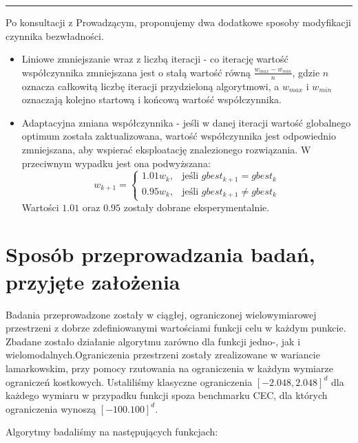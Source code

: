 \documentclass[12pt]{article}
\begin{document}
\begin{center}
	\rule{0.8\linewidth}{0.4pt}
\end{center}

Po konsultacji z Prowadzącym, proponujemy dwa dodatkowe sposoby modyfikacji czynnika bezwładności.
\begin{itemize}
	\item Liniowe zmniejszanie wraz z liczbą iteracji - co iterację wartość współczynnika zmniejszana
	      jest o stałą wartość równą $\frac{w_{max} - w_{min}}{n}$, gdzie $n$ oznacza całkowitą liczbę iteracji
	      przydzieloną algorytmowi, a $w_{max}$ i $w_{min}$ oznaczają kolejno startową i końcową wartość współczynnika.
	\item Adaptacyjna zmiana współczynnika - jeśli w danej iteracji wartość globalnego optimum została zaktualizowana, wartość współczynnika
	      jest odpowiednio zmniejszana, aby wspierać eksploatację znalezionego rozwiązania. W przeciwnym wypadku jest ona podwyższana:
	      \[
		      w_{k+1} =
		      \begin{cases}
			      1.01w_{k}, & \text{jeśli } gbest_{k+1} = gbest_{k}    \\
			      0.95w_{k}, & \text{jeśli } gbest_{k+1} \neq gbest_{k}
		      \end{cases}
	      \]
	      Wartości $1.01$ oraz $0.95$ zostały dobrane eksperymentalnie.
\end{itemize}

\section{Sposób przeprowadzania badań, przyjęte założenia}

Badania przeprowadzone zostały w ciągłej, ograniczonej wielowymiarowej przestrzeni z dobrze zdefiniowanymi wartościami funkcji celu w każdym punkcie.
Zbadane zostało działanie algorytmu zarówno dla funkcji jedno-, jak i wielomodalnych.Ograniczenia przestrzeni zostały zrealizowane w wariancie lamarkowskim,
przy pomocy rzutowania na ograniczenia w każdym wymiarze ograniczeń kostkowych. Ustaliliśmy klasyczne ograniczenia $[-2.048, 2.048]^d$ dla każdego wymiaru w przypadku
funkcji spoza benchmarku CEC, dla których ograniczenia wynoszą $[-100. 100]^d$.


Algorytmy badaliśmy na następujących funkcjach:
\end{document}
